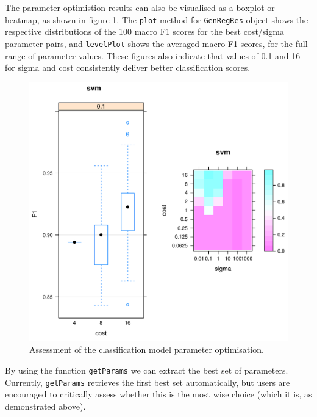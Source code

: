 The parameter optimistion results can also be visualised as a boxplot
or heatmap, as shown in figure \ref{fig:visualisOptHide}.  The
\texttt{plot} method for \texttt{GenRegRes} object shows the
respective distributions of the 100 macro F1 scores for the best
cost/sigma parameter pairs, and \texttt{levelPlot} shows the averaged
macro F1 scores, for the full range of parameter values. These figures
also indicate that values of 0.1 and 16 for sigma and cost
consistently deliver better classification scores. 

\begin{knitrout}
\color{fgcolor}\begin{kframe}
\begin{alltt}
\end{alltt}
\end{kframe}
\end{knitrout}

\begin{figure}[!ht]
  \centering
\begin{knitrout}
\color{fgcolor}
\includegraphics[width=.65\textwidth]{figure/visualiseOptHide-1} 

\end{knitrout}
  \caption{Assessment of the classification model parameter optimisation.}
  \label{fig:visualisOptHide}
\end{figure}

\pagebreak

By using the function \texttt{getParams} we can extract the best set
of parameters. Currently, \texttt{getParams} retrieves the first best
set automatically, but users are encouraged to critically assess
whether this is the most wise choice (which it is, as demonstrated
above).

